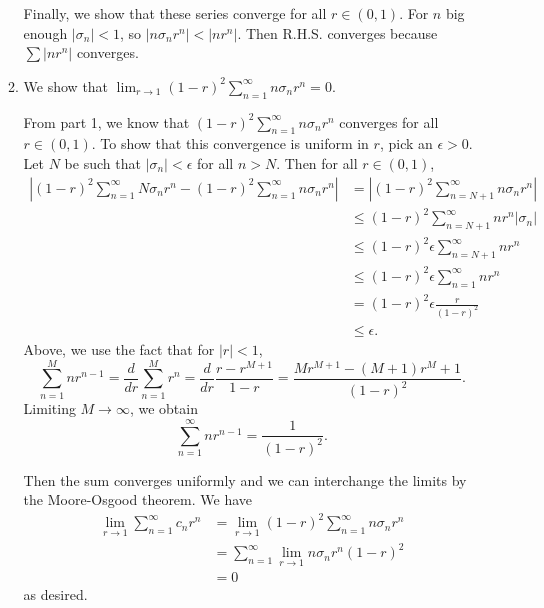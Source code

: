 \documentclass[oneside]{article}
\newcommand\abs[1]{\left|#1\right|}
\begin{document}
\begin{enumerate}[label=(\alph*)]
\begin{enumerate}[label=\textbf{\arabic*.}]
        Finally, we show that these series converge for all $r \in (0,1)$. For
        $n$ big enough $\abs{\sigma_n} < 1$, so
        $\abs{n\sigma_nr^n} < \abs{nr^n}$. Then R.H.S. converges because
        $\sum \abs{nr^n}$ converges.

      \item We show that
        $\lim_{r\to1} (1-r)^2\sum_{n=1}^\infty n \sigma_nr^n = 0$.

        From part 1, we know that $(1-r)^2 \sum_{n=1}^\infty n\sigma_n r^n$
        converges for all $r \in (0, 1)$. To show
        that this convergence is uniform in $r$, pick an $\epsilon > 0$. Let
        $N$ be such that $\abs{\sigma_n} < \epsilon$ for all $n > N$. Then for
        all $r \in (0, 1)$,\begin{align*}
          \abs{(1-r)^2 \sum_{n=1}^\infty N\sigma_nr^n
          - (1-r)^2 \sum_{n=1}^\infty n\sigma_nr^n}
          &= \abs{(1-r)^2 \sum_{n=N+1}^\infty n\sigma_nr^n} \\
          &\leq (1-r)^2 \sum_{n=N+1}^\infty nr^n\abs{\sigma_n} \\
          &\leq (1-r)^2 \epsilon\sum_{n=N+1}^\infty nr^n \\
          &\leq (1-r)^2 \epsilon\sum_{n=1}^\infty nr^n \\
          &= (1-r)^2 \epsilon\frac{r}{(1-r)^2} \\
          &\leq \epsilon \text{.}
        \end{align*} Above, we use the fact that for $\abs{r} < 1$,
        \[
          \sum_{n=1}^M nr^{n-1}
          = \frac{d}{dr}\sum_{n=1}^M r^n
          = \frac{d}{dr}\frac{r-r^{M+1}}{1-r}
          = \frac{Mr^{M+1}-(M+1)r^M+1}{(1-r)^2} \text{.}
        \] Limiting $M \to \infty$, we obtain\begin{equation}
          \label{eq:infinite-sum-nr}
          \sum_{n=1}^\infty nr^{n-1}
          = \frac{1}{(1-r)^2} \text{.}
        \end{equation}

        Then the sum converges uniformly and we can interchange the limits by
        the Moore-Osgood theorem. We have \begin{align*}
          \lim_{r\to1}\sum_{n=1}^\infty c_nr^n
          &= \lim_{r\to1}(1-r)^2\sum_{n=1}^\infty n\sigma_nr^n \\
          &= \sum_{n=1}^\infty \lim_{r\to1}n\sigma_nr^n(1-r)^2 \\
          &= 0
        \end{align*} as desired.


\end{enumerate}
\end{enumerate}
\end{document}
